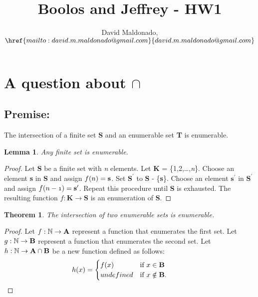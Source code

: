 \documentclass[a4paper,11pt]{article}
\author{David Maldonado, $\href{mailto:david.m.maldonado@gmail.com}%
{david.m.maldonado@gmail.com}$}
\title{Boolos and Jeffrey - HW1}
\newtheorem{lem}{Lemma}[section]
\newtheorem{thm}{Theorem}[section]
\begin{document}
\maketitle

\bigskip


\section{A question about $\cap$} 

	\subsection*{Premise:}
	The intersection of a finite set \textbf{S} and an enumerable set \textbf{T} is enumerable.
	
	\bigskip

	\begin{lem}Any finite set is enumerable.\end{lem}
		\begin{proof}
		Let \textbf{S} be a finite set with \textit{n} elements. Let \textbf{K} = \{1,2,\dots,\textit{n}\}. 
		Choose an element \textbf{s} in \textbf{S} and assign $\mathnormal{f(n)} = \textbf{s}$. 
		Set $\textbf{S}^\prime$ to \textbf{S} - \{\textbf{s}\}. Choose an element $\textbf{s}^\prime$ 
		in $\textbf{S}^\prime$ and assign $\mathnormal{f(n-1)} = \textbf{s}^\prime$. 
		Repeat this procedure until \textbf{S} is exhausted. The resulting function $f : \textbf{K} \rightarrow 	
		\textbf{S}$ is an enumeration of \textbf{S}.
		\end{proof}
		
		\bigskip
		
	\begin{thm}The intersection of two enumerable sets is enumerable.\end{thm}
		\begin{proof}
		Let $\mathnormal{f}: \mathbb{N} \rightarrow \textbf{A}$ represent 		a function that enumerates the 	first set. Let $\mathnormal{g}: \mathbb{N} \rightarrow \textbf{B}$ 
		represent a function that enumerates the second set. Let $\mathnormal{h}: \mathbb{N} \rightarrow 
		\textbf{A} \cap \textbf{B}$ be a new function defined as follows: 
		\bigskip
		\begin{equation*} \hspace*{-1cm}  h(x) = \begin{cases} f(x) &\mbox{if } x \in \textbf{B} \\ 
		undefined & \mbox{if } x \notin \textbf{B}. \end{cases} \end{equation*}
		\end{proof}
		
\end{document}
